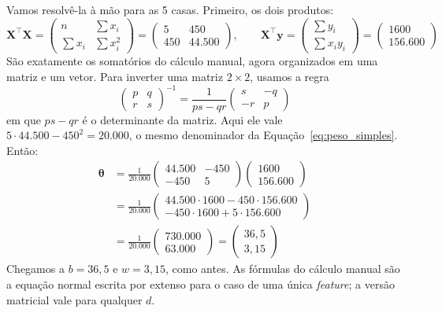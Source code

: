 \documentclass[a4paper,12pt,openany]{book}
\begin{document}
Vamos resolvê-la à mão para as 5 casas. Primeiro, os dois produtos:
\[
\mathbf{X}^\top\mathbf{X} = \begin{pmatrix} n & \sum x_i \\ \sum x_i & \sum x_i^2 \end{pmatrix} = \begin{pmatrix} 5 & 450 \\ 450 & 44.500 \end{pmatrix},
\qquad
\mathbf{X}^\top\mathbf{y} = \begin{pmatrix} \sum y_i \\ \sum x_i y_i \end{pmatrix} = \begin{pmatrix} 1600 \\ 156.600 \end{pmatrix}
\]
São exatamente os somatórios do cálculo manual, agora organizados em uma matriz e um vetor. Para inverter uma matriz \(2 \times 2\), usamos a regra
\[
\begin{pmatrix} p & q \\ r & s \end{pmatrix}^{-1} = \frac{1}{ps - qr} \begin{pmatrix} s & -q \\ -r & p \end{pmatrix}
\]
em que \(ps - qr\) é o determinante da matriz. Aqui ele vale \(5 \cdot 44.500 - 450^2 = 20.000\), o mesmo denominador da Equação~\ref{eq:peso_simples}. Então:
\begin{align*}
\boldsymbol{\theta} &= \frac{1}{20.000} \begin{pmatrix} 44.500 & -450 \\ -450 & 5 \end{pmatrix} \begin{pmatrix} 1600 \\ 156.600 \end{pmatrix} \\[4pt]
&= \frac{1}{20.000} \begin{pmatrix} 44.500 \cdot 1600 - 450 \cdot 156.600 \\ -450 \cdot 1600 + 5 \cdot 156.600 \end{pmatrix} \\[4pt]
&= \frac{1}{20.000} \begin{pmatrix} 730.000 \\ 63.000 \end{pmatrix}
= \begin{pmatrix} 36,5 \\ 3,15 \end{pmatrix}
\end{align*}
Chegamos a \(b = 36,5\) e \(w = 3,15\), como antes. As fórmulas do cálculo manual são a equação normal escrita por extenso para o caso de uma única \textit{feature}; a versão matricial vale para qualquer \(d\).
\end{document}
